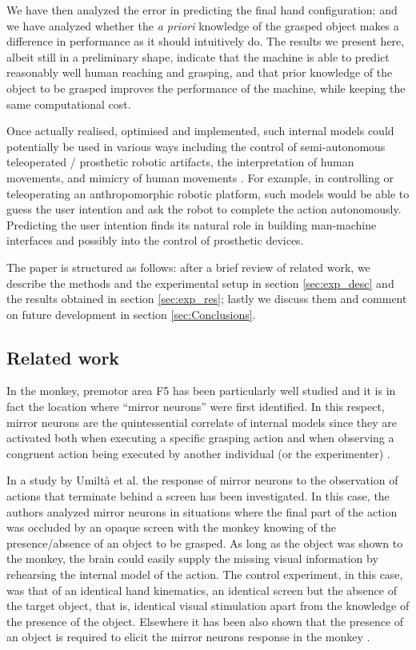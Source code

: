We have then analyzed the error in predicting the final hand
configuration; and we have analyzed whether the \emph{a priori}
knowledge of the grasped object makes a difference in performance as
it should intuitively do. The results we present here, albeit still in
a preliminary shape, indicate that the machine is able to predict
reasonably well human reaching and grasping, and that prior knowledge
of the object to be grasped improves the performance of the machine,
while keeping the same computational cost.

Once actually realised, optimised and implemented, such internal
models could potentially be used in various ways including the control
of semi-autonomous teleoperated / prosthetic robotic artifacts, the
interpretation of human movements, and mimicry of human movements
\cite{wolpert-01}. For example, in controlling or teleoperating an
anthropomorphic robotic platform, such models would be able to guess
the user intention and ask the robot to complete the action
autonomously. Predicting the user intention finds its natural role in
building man-machine interfaces and possibly into the control of
prosthetic devices.

The paper is structured as follows: after a brief review of related
work, we describe the methods and the experimental setup in section
\ref{sec:exp_desc} and the results obtained in section
\ref{sec:exp_res}; lastly we discuss them and comment on future
development in section \ref{sec:Conclusions}.

\subsection{Related work}

In the monkey, premotor area F5 has been particularly well studied and
it is in fact the location where ``mirror neurons'' were first
identified. In this respect, mirror neurons are the quintessential
correlate of internal models since they are activated both when
executing a specific grasping action and when observing a congruent
action being executed by another individual (or the experimenter)
\cite{fadiga-00}.

In a study by Umilt\`a et al. \cite{umilta-01} the response of mirror
neurons to the observation of actions that terminate behind a screen
has been investigated. In this case, the authors analyzed mirror
neurons in situations where the final part of the action was occluded
by an opaque screen with the monkey knowing of the presence/absence of
an object to be grasped. As long as the object was shown to the
monkey, the brain could easily supply the missing visual information
by rehearsing the internal model of the action. The control
experiment, in this case, was that of an identical hand kinematics, an
identical screen but the absence of the target object, that is,
identical visual stimulation apart from the knowledge of the presence
of the object. Elsewhere it has been also shown that the presence of
an object is required to elicit the mirror neurons response in the
monkey \cite{gallese-96}.


